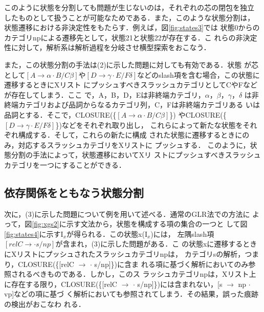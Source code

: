 このように状態を分割しても問題が生じないのは，それぞれの芯の閉包を独立
したものとして扱うことが可能なためである．また，このような状態分割は，
状態遷移における非決定性をもたらす．例えば，図\ref{fig:states3}では 
状態0からのカテゴリnpによる遷移先として，状態21と状態22が存在する．こ
れらの非決定性に対して，解析系は解析過程を分岐させ横型探索をおこなう．

また，この状態分割の手法は(2)に示した問題に対しても有効である．状態
が芯として$[A \to \alpha \cdot B/C \beta]$や$[D \to \gamma \cdot E/F
\delta]$などのslash項を含む場合，この状態に遷移するときにXリスト
にプッシュすべきスラッシュカテゴリとしてCやFなどが存在してしまう．ここ
で，A，B，D，Eは非終端カテゴリ，$\alpha$，$\beta$，$\gamma$，$\delta$
は非終端カテゴリおよび品詞からなるカテゴリ列，C，Fは非終端カテゴリある
いは品詞とする．そこで，CLOSURE(\{$[A \to \alpha \cdot B/C \beta]$\})
やCLOSURE(\{$[D \to \gamma \cdot E/F \delta]$\})などをそれぞれ取り出し，
これらによって新たな状態をそれぞれ構成する．そして，これらの新たに構成
された状態に遷移するときにのみ，対応するスラッシュカテゴリをXリストに
プッシュする． このように，状態分割の手法によって，状態遷移においてXリ
ストにプッシュすべきスラッシュカテゴリを一つにすることができる．

\subsection{依存関係をともなう状態分割}

次に，(3)に示した問題について例を用いて述べる．通常のGLR法での方法に
よって，図\ref{fig:xgs2}に示す文法から，状態を構成する項の集合の一つと
して図\ref{fig:states4}に示すI$_{x}$が得られる．この状態x(I$_{x}$)には，
左隅slash項$[relC \to \cdot s/np]$が含まれ，(3)に示した問題がある．こ
の状態xに遷移するときにXリストにプッシュされたスラッシュカテゴリnpは，
カテゴリsの解析，つまり，CLOSURE(\{[relC $\to$ $\cdot$ s/np]\})に含ま
れる項に基づく解析においてのみ参照されるべきものである．しかし，このス
ラッシュカテゴリnpは，Xリスト上に存在する限り，CLOSURE(\{[relC $\to$
$\cdot$ s/np]\})には含まれない，[s $\to$ np $\cdot$ vp]などの項に基づ
く解析においても参照されてしまう．その結果，誤った痕跡の検出がおこなわ
れる．

